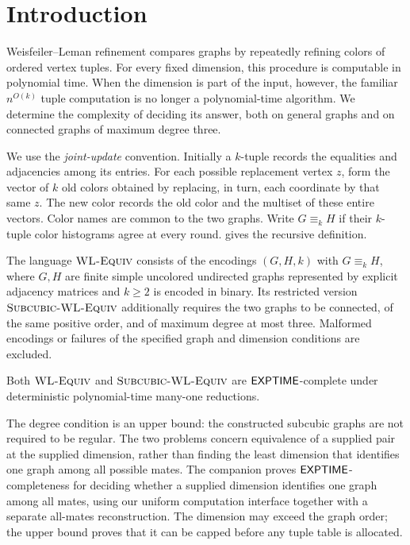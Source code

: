 \section{Introduction}\label{sec:introduction}

Weisfeiler--Leman refinement compares graphs by repeatedly refining colors
of ordered vertex tuples. For every fixed dimension, this procedure is
computable in polynomial time. When the dimension is part of the input,
however, the familiar \(n^{O(k)}\) tuple computation is no longer a
polynomial-time algorithm. We determine the complexity of deciding its
answer, both on general graphs and on connected graphs of maximum degree
three.

We use the \emph{joint-update} convention. Initially a \(k\)-tuple records
the equalities and adjacencies among its entries. For each possible
replacement vertex \(z\), form the vector of \(k\) old colors obtained by
replacing, in turn, each coordinate by that same \(z\). The new color
records the old color and the multiset of these entire vectors. Color
names are common to the two graphs. Write \(G\equiv_k H\) if their
\(k\)-tuple color histograms agree at every round.
 gives the recursive definition.

The language \(\textnormal{\textsc{WL-Equiv}}\) consists of the encodings \((G,H,k)\) with
\(G\equiv_k H\), where \(G,H\) are finite simple uncolored undirected
graphs represented by explicit adjacency matrices and \(k\ge2\) is
encoded in binary. Its restricted version \(\textnormal{\textsc{Subcubic-WL-Equiv}}\) additionally
requires the two graphs to be connected, of the same positive order,
and of maximum degree at most three. Malformed encodings or failures
of the specified graph and dimension conditions are excluded.

\begin{theorem}\label{thm:main}
Both \(\textnormal{\textsc{WL-Equiv}}\) and \(\textnormal{\textsc{Subcubic-WL-Equiv}}\) are \(\mathsf{EXPTIME}\)-complete under deterministic
polynomial-time many-one reductions.
\end{theorem}

The degree condition is an upper bound: the constructed subcubic graphs
are not required to be regular. The two problems concern equivalence
of a supplied pair at the supplied dimension, rather than finding the
least dimension that identifies one graph among all possible mates.
The companion \citep[Theorem~1.1]{CompanionIdentification}
proves \(\mathsf{EXPTIME}\)-completeness for deciding whether a supplied
dimension identifies one graph among all mates, using our uniform
computation interface together with a separate all-mates reconstruction.
The dimension may exceed the graph order; the upper bound proves that
it can be capped before any tuple table is allocated.

